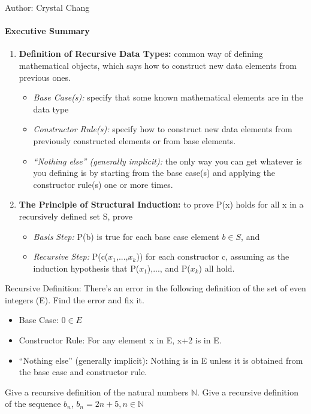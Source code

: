 \documentclass[solution, letterpaper]{cs20inclass}
\begin{document}

\noindent Author: Crystal Chang

\paragraph*{Executive Summary}
\begin{enumerate}
\item \textbf{Definition of Recursive Data Types:} common way of defining mathematical objects, which says how to construct new data elements from previous ones.
\begin{itemize}
\item {\em Base Case(s):} specify that some known mathematical elements are in the data type
\item {\em Constructor Rule(s):} specify how to construct new data elements from previously constructed elements or from base elements.
\item {\em “Nothing else” (generally implicit):} the only way you can get whatever is you defining is by starting from the base case(s) and applying the constructor rule(s) one or more times.
\end{itemize}

\item \textbf{The Principle of Structural Induction:} to prove P(x) holds for all x in a recursively defined set S, prove
\begin{itemize}
\item {\em Basis Step:} P(b) is true for each base case element $b \in S$, and 
\item {\em Recursive Step:} P(c($x_1$,...,$x_k$)) for each constructor c, assuming as the induction hypothesis that P($x_1$),..., and P($x_k$) all hold.
\end{itemize}
\end{enumerate}

\problem Recursive Definition:
\subproblem There's an error in the following definition of the set of even integers (E). Find the error and fix it. 
\begin{itemize}
\item Base Case:  $0\in E$
\item Constructor Rule: For any element x in E, x+2 is in E. 
\item “Nothing else” (generally implicit): Nothing is in E unless it is obtained from the base case and constructor rule.
\end{itemize}
\subproblem Give a recursive definition of the natural numbers $\mathbb{N}$.
\subproblem Give a recursive definition of the sequence $b_n$, $b_n=2n+5,  n\in\mathbb{N}$
\end{document}

